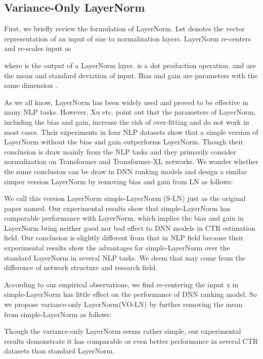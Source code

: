 \documentclass[sigconf]{acmart}
\begin{document}
\subsection{Variance-Only LayerNorm}
First, we briefly review the formulation of LayerNorm. Let  denotes the vector representation of an input of size  to normalization layers. LayerNorm re-centers and re-scales input  as


where  is the output of a LayerNorm layer.  is a dot production operation.  and  are the mean and standard deviation of input. Bias  and gain  are parameters with the same dimension .


As we all know, LayerNorm has been widely used and proved to be effective in many NLP tasks. However, Xu etc.\cite{xu2019understanding} point out that the parameters of LayerNorm, including the bias and gain, increase the risk of over-fitting and do not work in most cases. Their experiments in four NLP datasets show that a simple version of LayerNorm without the bias and gain outperforms LayerNorm. Though their conclusion is draw mainly from the NLP tasks and they primarily consider normalization on Transformer and Transformer-XL networks. We wonder whether the same conclusion can be draw in DNN ranking models and design a similar simper version LayerNorm by removing bias and gain from LN as follows:


We call this version LayerNorm simple-LayerNorm (S-LN) just as the original paper \cite{xu2019understanding} named. Our experimental results show that simple-LayerNorm has comparable performance with LayerNorm, which implies the bias and gain in LayerNorm bring neither good nor bad effect to DNN models in CTR estimation field. Our conclusion is slightly different from that in NLP field because their experimental results \cite{xu2019understanding} show the advantages for simple-LayerNorm over the standard LayerNorm in several NLP tasks. We deem that may come from the difference of network structure and research field.


According to our empirical observations, we find re-centering the input x in simple-LayerNorm has little effect on the performance of DNN ranking model. So we propose variance-only LayerNorm(VO-LN) by further removing the mean from simple-LayerNorm as follows:




Though the variance-only LayerNorm seems rather simple, our experimental results demonstrate it has comparable or even better performance in several CTR datasets than standard LayerNorm.
\end{document}
